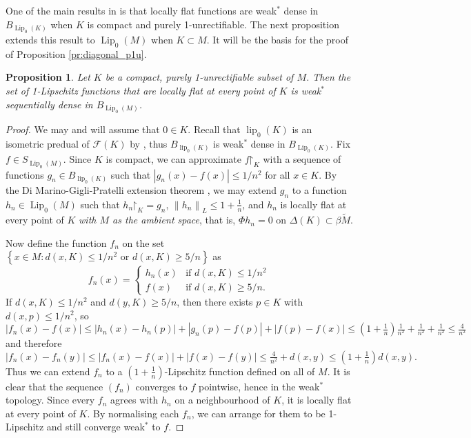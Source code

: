 \documentclass[a4paper,10pt]{amsart}
\DeclareMathOperator{\Lip}{Lip}                             %
\DeclareMathOperator{\lip}{lip}                             %
\newcommand{\abs}[1]{\left|{#1}\right|}                     %
\newcommand{\pare}[1]{\left({#1}\right)}                    %
\newcommand{\set}[1]{\left\{{#1}\right\}}                   %
\newcommand{\norm}[1]{\left\|{#1}\right\|}                  %
\newcommand{\restrict}{\mathord{\upharpoonright}}           %
\newcommand{\lipfree}[1]{\mathcal{F}({#1})}                 %
\newcommand{\lipnorm}[1]{\norm{#1}_L}                       %
\newcommand{\wt}[1]{\widetilde{#1}}                         %
\newcommand{\bwt}[1]{\beta\wt{#1}}                          %
\renewcommand{\leq}{\leqslant}
\renewcommand{\geq}{\geqslant}
\theoremstyle{plain}
\newtheorem{proposition}[theorem]{Proposition}
\theoremstyle{definition}
\theoremstyle{remark}
\begin{document}
One of the main results in \cite{AGPP} is that locally flat functions are weak$^*$ dense in $B_{\Lip_0(K)}$ when $K$ is compact and purely 1-unrectifiable. The next proposition extends this result to $\Lip_0(M)$ when $K\subset M$. It will be the basis for the proof of Proposition \ref{pr:diagonal_p1u}.


\begin{proposition}\label{pr:p1u compact approx}
Let $K$ be a compact, purely 1-unrectifiable subset of $M$. Then the set of 1-Lipschitz functions that are locally flat at every point of $K$ is weak$^*$ sequentially dense in $B_{\Lip_0(M)}$.
\end{proposition}

\begin{proof}
We may and will assume that $0\in K$. Recall that $\lip_0(K)$ is an isometric predual of $\lipfree{K}$ by \cite[Theorem B]{AGPP}, thus $B_{\lip_0(K)}$ is weak$^*$ dense in $B_{\Lip_0(K)}$. Fix $f\in S_{\Lip_0(M)}$. Since $K$ is compact, we can approximate $f\restrict_K$ with a sequence of functions $g_n\in B_{\lip_0(K)}$ such that $\abs{g_n(x)-f(x)}\leq 1/n^2$ for all $x\in K$. By the Di Marino-Gigli-Pratelli extension theorem \cite[Theorem 1.1]{DGP}, we may extend $g_n$ to a function $h_n\in\Lip_0(M)$ such that $h_n\restrict_K=g_n$, $\lipnorm{h_n}\leq 1+\tfrac{1}{n}$, and $h_n$ is locally flat at every point of $K$ \emph{with $M$ as the ambient space}, that is, $\Phi h_n=0$ on $\Delta(K)\subset\bwt{M}$.

Now define the function $f_n$ on the set $\set{x\in M : d(x,K)\leq 1/n^2 \text{ or } d(x,K)\geq 5/n}$ as
$$
f_n(x) = \begin{cases}
h_n(x) &\text{if $d(x,K)\leq 1/n^2$} \\
f(x) &\text{if $d(x,K)\geq 5/n$}.
\end{cases}
$$
If $d(x,K)\leq 1/n^2$ and $d(y,K)\geq 5/n$, then there exists $p\in K$ with $d(x,p)\leq 1/n^2$, so
$$
\abs{f_n(x)-f(x)} \leq \abs{h_n(x)-h_n(p)} + \abs{g_n(p)-f(p)} + \abs{f(p)-f(x)} \leq (1+\tfrac{1}{n})\tfrac{1}{n^2} + \tfrac{1}{n^2} + \tfrac{1}{n^2} \leq \tfrac{4}{n^2}
$$
and therefore
$$
\abs{f_n(x)-f_n(y)} \leq \abs{f_n(x)-f(x)} + \abs{f(x)-f(y)} \leq \tfrac{4}{n^2}+d(x,y) \leq \pare{1+\tfrac{1}{n}}d(x,y) .
$$
Thus we can extend $f_n$ to a $(1+\tfrac{1}{n})$-Lipschitz function defined on all of $M$. It is clear that the sequence $(f_n)$ converges to $f$ pointwise, hence in the weak$^*$ topology. Since every $f_n$ agrees with $h_n$ on a neighbourhood of $K$, it is locally flat at every point of $K$. By normalising each $f_n$, we can arrange for them to be 1-Lipschitz and still converge weak$^*$ to $f$.
\end{proof}
\end{document}
